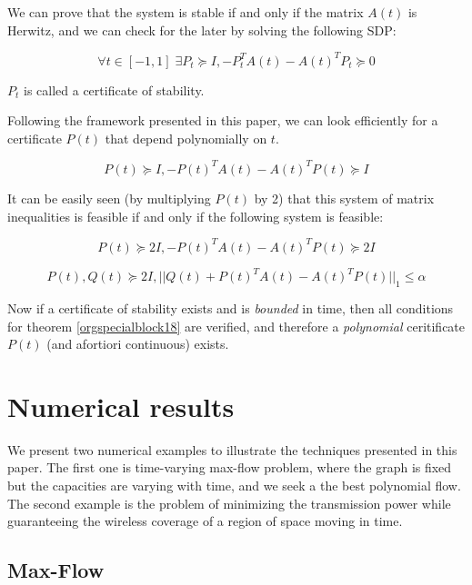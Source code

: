 \documentclass[moor]{informs1}
\begin{document}
We can prove that the system is stable if and only if the matrix \(A(t)\) is Herwitz, and we can check for the later by solving the following SDP:

$$\forall t \in [-1, 1]\; \exists P_t \succeq I, - P_t^TA(t) - A(t)^T P_t \succeq 0$$

\(P_t\) is called a certificate of stability.

Following the framework presented in this paper, we can look efficiently for a certificate \(P(t)\) that depend polynomially on \(t\).

$$P(t) \succeq I, - P(t)^TA(t) - A(t)^T P(t) \succeq I$$

It can be easily seen (by multiplying \(P(t)\) by 2) that this system of matrix inequalities is feasible if and only if the following system is feasible:

$$P(t) \succeq 2I, - P(t)^TA(t) - A(t)^T P(t) \succeq 2I$$


$$P(t), Q(t) \succeq 2I, ||Q(t) + P(t)^TA(t) - A(t)^T P(t)||_1 \le \alpha$$

Now if a certificate of stability exists and is \emph{bounded} in time, then all conditions for theorem \ref{orgspecialblock18} are verified, and therefore a \emph{polynomial} ceritificate \(P(t)\) (and afortiori continuous) exists.
\newpage


\section{Numerical results}
\label{sec:orgheadline23}
\label{orgtarget8}

We present two numerical examples to illustrate the techniques presented in this paper. The first one is time-varying max-flow problem, where the graph is fixed but the capacities are varying with time, and we seek a the best polynomial flow. The second example is the problem of minimizing the transmission power while guaranteeing the wireless coverage of a region of space moving in time.

\subsection{Max-Flow}
\label{sec:orgheadline21}
\end{document}
